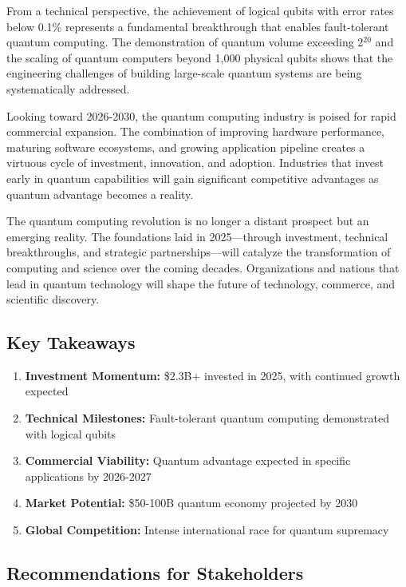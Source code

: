 \documentclass[12pt,a4paper]{article}
\begin{document}
From a technical perspective, the achievement of logical qubits with error rates below 0.1\% represents a fundamental breakthrough that enables fault-tolerant quantum computing. The demonstration of quantum volume exceeding 2$^{20}$ and the scaling of quantum computers beyond 1,000 physical qubits shows that the engineering challenges of building large-scale quantum systems are being systematically addressed.

Looking toward 2026-2030, the quantum computing industry is poised for rapid commercial expansion. The combination of improving hardware performance, maturing software ecosystems, and growing application pipeline creates a virtuous cycle of investment, innovation, and adoption. Industries that invest early in quantum capabilities will gain significant competitive advantages as quantum advantage becomes a reality.

The quantum computing revolution is no longer a distant prospect but an emerging reality. The foundations laid in 2025—through investment, technical breakthroughs, and strategic partnerships—will catalyze the transformation of computing and science over the coming decades. Organizations and nations that lead in quantum technology will shape the future of technology, commerce, and scientific discovery.

\subsection{Key Takeaways}

\begin{enumerate}
    \item \textbf{Investment Momentum:} \$2.3B+ invested in 2025, with continued growth expected
    \item \textbf{Technical Milestones:} Fault-tolerant quantum computing demonstrated with logical qubits
    \item \textbf{Commercial Viability:} Quantum advantage expected in specific applications by 2026-2027
    \item \textbf{Market Potential:} \$50-100B quantum economy projected by 2030
    \item \textbf{Global Competition:} Intense international race for quantum supremacy
\end{enumerate}

\subsection{Recommendations for Stakeholders}
\end{document}
